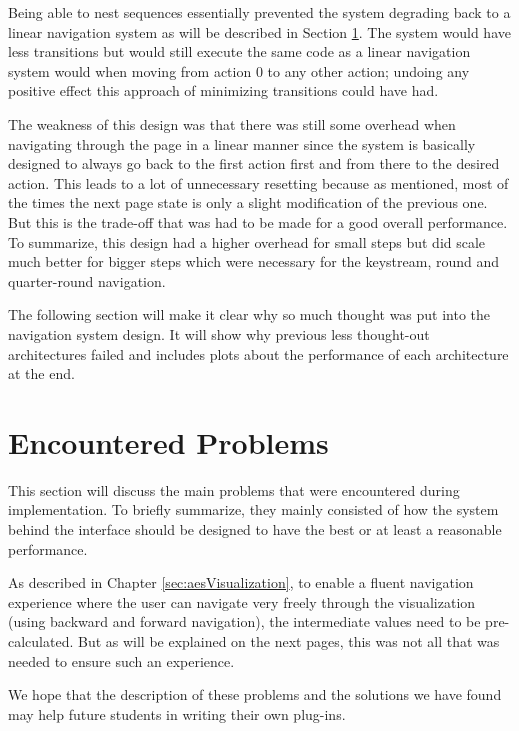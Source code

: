 Being able to nest sequences essentially prevented the system degrading back to a linear navigation system as will be described in Section \ref{sec:encounteredProblems}. The system would have less transitions but would still execute the same code as a linear navigation system would when moving from action 0 to any other action; undoing any positive effect this approach of minimizing transitions could have had.

The weakness of this design was that there was still some overhead when navigating through the page in a linear manner since the system is basically designed to always go back to the first action first and from there to the desired action. This leads to a lot of unnecessary resetting because as mentioned, most of the times the next page state is only a slight modification of the previous one. But this is the trade-off that was had to be made for a good overall performance. To summarize, this design had a higher overhead for small steps but did scale much better for bigger steps which were necessary for the keystream, round and quarter-round navigation.

The following section will make it clear why so much thought was put into the navigation system design. It will show why previous less thought-out architectures failed and includes plots about the performance of each architecture at the end.

\section{Encountered Problems}
\label{sec:encounteredProblems}

This section will discuss the main problems that were encountered during implementation. To briefly summarize, they mainly consisted of how the system behind the interface should be designed to have the best or at least a reasonable performance.

As described in Chapter \ref{sec:aesVisualization}, to enable a fluent navigation experience where the user can navigate very freely through the visualization (using backward and forward navigation), the intermediate values need to be pre-calculated. But as will be explained on the next pages, this was not all that was needed to ensure such an experience.

We hope that the description of these problems and the solutions we have found may help future students in writing their own plug-ins.

